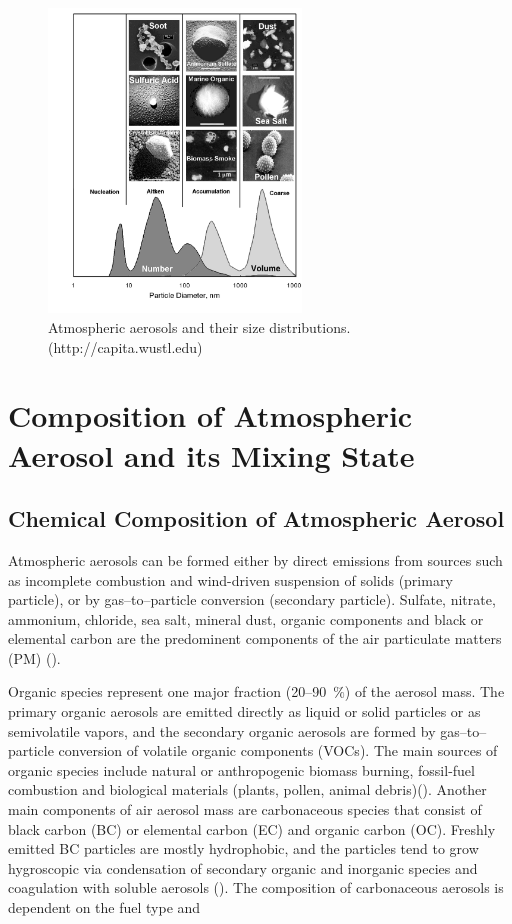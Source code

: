\documentclass[12pt, fullpage]{uiucthesis2009}
\begin{document}
		\begin{figure}[h] 
			\begin{center}
				\includegraphics[width = 0.6\textwidth]{Figure26}
				\caption[Atmospheric aerosols and their size distributions]{\label{fig_P26} Atmospheric aerosols and their size distributions. \\ (http://capita.wustl.edu)}
			\end{center}
		\end{figure}

	\section{Composition of Atmospheric Aerosol and its Mixing State}
	\subsection{Chemical Composition of Atmospheric Aerosol}
	Atmospheric aerosols can be formed either by direct emissions from sources such as incomplete combustion and wind-driven suspension of solids (primary particle), or by gas--to--particle conversion (secondary particle). Sulfate, nitrate, ammonium, chloride, sea salt, mineral dust, organic components and black or elemental carbon are the predominent components of the air particulate matters (PM) (\cite{poschl2005}). 
	
	Organic species represent one major fraction (20--90~$\%$) of the aerosol mass. The primary organic aerosols are emitted directly as liquid or solid particles or as semivolatile vapors, and the secondary organic aerosols are formed by gas--to--particle conversion of volatile organic components (VOCs). The main sources of organic species include natural or anthropogenic biomass burning, fossil-fuel combustion and biological materials (plants, pollen, animal debris)(\cite{poschl2005}). Another main components of air aerosol mass are carbonaceous species that consist of black carbon (BC) or elemental carbon (EC) and organic carbon (OC). Freshly emitted BC particles are mostly hydrophobic, and the particles tend to grow hygroscopic via condensation of secondary organic and inorganic species and coagulation with soluble aerosols (\cite{riemer2010estimating}). The composition of carbonaceous aerosols is dependent on the fuel type and 
	
\end{document}
